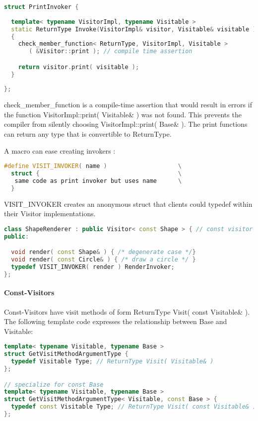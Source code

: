 \documentclass{book}
\begin{document}
\begin{lstlisting}[caption={visitor pattern sample code 5, commandexample.cpp},language=C++]
struct PrintInvoker {
 
  template< typename VisitorImpl, typename Visitable >
  static ReturnType Invoke(VisitorImpl& visitor, Visitable& visitable )
  {
    check_member_function< ReturnType, VisitorImpl, Visitable >
       ( &Visitor::print ); // compile time assertion

    return visitor.print( visitable );
  }
  
};
\end{lstlisting}

check\_member\_function is a compile-time assertion that would result in errors if the function VisitorImpl::print( Visitable\& ) was not found.
This prevents the compiler from silently choosing VisitorImpl::print( Base\& ). The print functions can return any type that is convertible to ReturnType.

A macro can ease creating invokers :

\begin{lstlisting}[caption={visitor pattern sample code 5, commandexample.cpp},language=C++]
#define VISIT_INVOKER( name )                    \
  struct {                                       \
   same code as print invoker but uses name      \
  }
\end{lstlisting}

VISIT\_INVOKER creates an anonymous struct that clients could typedef within their Visitor implementations.

\begin{lstlisting}[caption={visitor pattern sample code 5, commandexample.cpp},language=C++]
class ShapeRenderer : public Visitor< const Shape > { // const visitor
public:

  void render( const Shape& ) { /* degenerate case */}
  void render( const Circle& ) { /* draw a circle */ }
  typedef VISIT_INVOKER( render ) RenderInvoker;
};
\end{lstlisting}

\paragraph{Const-Visitors}

Const-Visitors have visit methods of form ReturnType Visit( const Visitable\& ). The following template code expresses the relationship between Base and Visitable:

\begin{lstlisting}[caption={visitor pattern sample code 5, commandexample.cpp},language=C++]
template< typename Visitable, typename Base >
struct GetVisitMethodArgumentType {
  typedef Visitable Type; // ReturnType Visit( Visitable& )
};

// specialize for const Base
template< typename Visitable, typename Base >
struct GetVisitMethodArgumentType< Visitable, const Base > {
  typedef const Visitable Type; // ReturnType Visit( const Visitable& )
};
\end{lstlisting}
\end{document}
